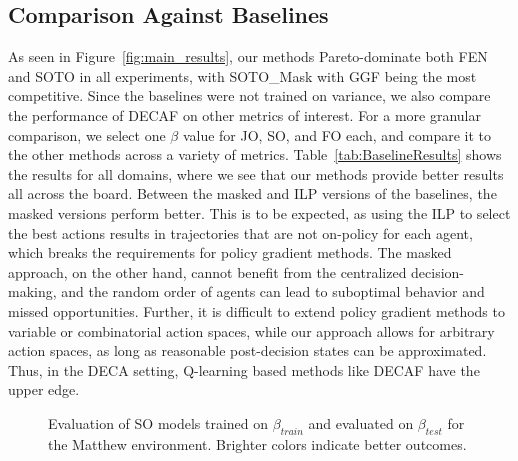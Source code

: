 \subsection{Comparison Against Baselines}

As seen in Figure~\ref{fig:main_results}, our methods Pareto-dominate both FEN and SOTO in all experiments, with SOTO\_Mask with GGF being the most competitive. 
Since the baselines were not trained on variance, we also compare the performance of DECAF on other metrics of interest.
For a more granular comparison, we select one $\beta$ value for JO, SO, and FO each, and compare it to the other methods across a variety of metrics. 
Table~\ref{tab:BaselineResults} shows the results for all domains, where we see that our methods provide better results all across the board.
Between the masked and ILP versions of the baselines, the masked versions perform better. This is to be expected, as using the ILP to select the best actions results in trajectories that are not on-policy for each agent, which breaks the requirements for policy gradient methods. The masked approach, on the other hand, cannot benefit from the centralized decision-making, and the random order of agents can lead to suboptimal behavior and missed opportunities. Further, it is difficult to extend policy gradient methods to variable or combinatorial action spaces, while our approach allows for arbitrary action spaces, as long as reasonable post-decision states can be approximated. Thus, in the DECA setting, Q-learning based methods like DECAF have the upper edge.


\begin{figure}[t]
    \centering
    \caption{Evaluation of SO models trained on $\beta_{train}$ and evaluated on $\beta_{test}$ for the Matthew environment. Brighter colors indicate better outcomes.}
    \label{fig:matthew}
\end{figure}


